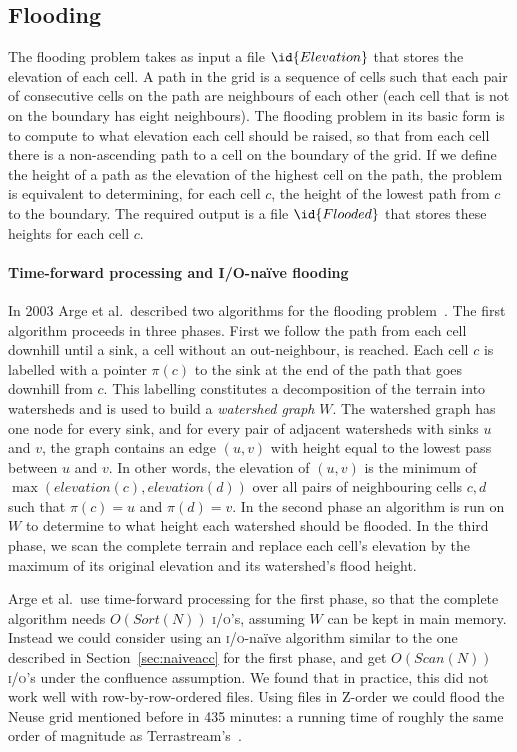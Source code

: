 \documentclass[10pt,a4paper]{article}
\def\io{\textsc{i/o}\xspace}
\def\ios{\textsc{i/o}'s\xspace}
\def\sort{\mathit{Sort}}
\def\scan{\mathit{Scan}}
\begin{document}
\subsection{Flooding}
The flooding problem takes as input a file $\id{Elevation}$ that stores the elevation of each cell. A path in the grid is a sequence of cells such that each pair of consecutive cells on the path are neighbours of each other (each cell that is not on the boundary has eight neighbours). The flooding problem in its basic form is to compute to what elevation each cell should be raised, so that from each cell there is a non-ascending path to a cell on the boundary of the grid. If we define the height of a path as the elevation of the highest cell on the path, the problem is equivalent to determining, for each cell $c$, the height of the lowest path from $c$ to the boundary. The required output is a file $\id{Flooded}$ that stores these heights for each cell $c$.

\paragraph{Time-forward processing and I/O-na\"ive flooding}
In 2003 Arge et al.\ described two algorithms for the flooding problem~\cite{terraflow}. The first algorithm proceeds in three phases.
First we follow the path from each cell downhill until a sink, a cell without an out-neighbour, is reached. Each cell $c$ is labelled with a pointer $\pi(c)$ to the sink at the end of the path that goes downhill from $c$. This labelling constitutes a decomposition of the terrain into watersheds and is used to build a \emph{watershed graph} $W$. The watershed graph has one node for every sink, and for every pair of adjacent watersheds with sinks $u$ and $v$, the graph contains an edge $(u,v)$ with height equal to the lowest pass between $u$ and $v$. In other words, the elevation of $(u,v)$ is the minimum of $\max(\mathit{elevation}(c),\mathit{elevation}(d))$ over all pairs of neighbouring cells $c,d$ such that $\pi(c) = u$ and $\pi(d) = v$.
In the second phase an algorithm is run on $W$ to determine to what height each watershed should be flooded. In the third phase, we scan the complete terrain and replace each cell's elevation by the maximum of its original elevation and its watershed's flood height.

Arge et al.\ use time-forward processing for the first phase, so that the complete algorithm needs $O(\sort(N))$ \ios, assuming $W$ can be kept in main memory. Instead we could consider using an \io-na\"ive algorithm similar to the one described in Section~\ref{sec:naiveacc} for the first phase, and get $O(\scan(N))$ \ios under the confluence assumption. We found that in practice, this did not work well with row-by-row-ordered files. Using files in Z-order we could flood the Neuse grid mentioned before in 435 minutes: a running time of roughly the same order of magnitude as Terrastream's~\cite{terrastream}.
\end{document}
